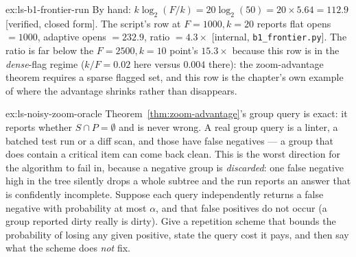 \documentclass[11pt,a4paper]{article}
\theoremstyle{definition}
\theoremstyle{plain}
\begin{document}
\begin{pdsolution}{ex:ls-b1-frontier-run}
By hand: $k\log_2(F/k)=20\log_2(50)=20\times5.64=112.9$ [verified, closed form]. The script's row at $F{=}1000,k{=}20$ reports flat opens $=1000$, adaptive opens $=232.9$, ratio $=4.3\times$ [internal, \texttt{b1\_frontier.py}]. The ratio is far below the $F{=}2500,k{=}10$ point's $15.3\times$ because this row is in the \emph{dense}-flag regime ($k/F=0.02$ here versus $0.004$ there): the zoom-advantage theorem requires a sparse flagged set, and this row is the chapter's own example of where the advantage shrinks rather than disappears.
\end{pdsolution}
\begin{pdexercise}[kind=Open,rating=3]{ex:ls-noisy-zoom-oracle}
Theorem~\ref{thm:zoom-advantage}'s group query is exact: it reports whether
$S\cap P=\emptyset$ and is never wrong. A real group query is a linter, a batched
test run or a diff scan, and those have false negatives --- a group that does
contain a critical item can come back clean. This is the worst direction for the
algorithm to fail in, because a negative group is \emph{discarded}: one false
negative high in the tree silently drops a whole subtree and the run reports an
answer that is confidently incomplete. Suppose each query independently returns a
false negative with probability at most $\alpha$, and that false positives do not
occur (a group reported dirty really is dirty). Give a repetition scheme that
bounds the probability of losing any given positive, state the query cost it
pays, and then say what the scheme does \emph{not} fix.
\end{pdexercise}
\end{document}
